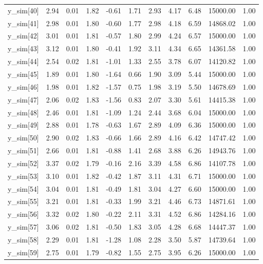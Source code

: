 \begin{table}[ht]
\begin{tabular}{rrrrrrrrrrr}
  y\_sim[40] & 2.94 & 0.01 & 1.82 & -0.61 & 1.71 & 2.93 & 4.17 & 6.48 & 15000.00 & 1.00 \\ 
  y\_sim[41] & 2.98 & 0.01 & 1.80 & -0.60 & 1.77 & 2.98 & 4.18 & 6.59 & 14868.02 & 1.00 \\ 
  y\_sim[42] & 3.01 & 0.01 & 1.81 & -0.57 & 1.80 & 2.99 & 4.24 & 6.57 & 15000.00 & 1.00 \\ 
  y\_sim[43] & 3.12 & 0.01 & 1.80 & -0.41 & 1.92 & 3.11 & 4.34 & 6.65 & 14361.58 & 1.00 \\ 
  y\_sim[44] & 2.54 & 0.02 & 1.81 & -1.01 & 1.33 & 2.55 & 3.78 & 6.07 & 14120.82 & 1.00 \\ 
  y\_sim[45] & 1.89 & 0.01 & 1.80 & -1.64 & 0.66 & 1.90 & 3.09 & 5.44 & 15000.00 & 1.00 \\ 
  y\_sim[46] & 1.98 & 0.01 & 1.82 & -1.57 & 0.75 & 1.98 & 3.19 & 5.50 & 14678.69 & 1.00 \\ 
  y\_sim[47] & 2.06 & 0.02 & 1.83 & -1.56 & 0.83 & 2.07 & 3.30 & 5.61 & 14415.38 & 1.00 \\ 
  y\_sim[48] & 2.46 & 0.01 & 1.81 & -1.09 & 1.24 & 2.44 & 3.68 & 6.04 & 15000.00 & 1.00 \\ 
  y\_sim[49] & 2.88 & 0.01 & 1.78 & -0.63 & 1.67 & 2.89 & 4.09 & 6.36 & 15000.00 & 1.00 \\ 
  y\_sim[50] & 2.90 & 0.02 & 1.83 & -0.66 & 1.66 & 2.89 & 4.16 & 6.42 & 14747.42 & 1.00 \\ 
  y\_sim[51] & 2.66 & 0.01 & 1.81 & -0.88 & 1.41 & 2.68 & 3.88 & 6.26 & 14943.76 & 1.00 \\ 
  y\_sim[52] & 3.37 & 0.02 & 1.79 & -0.16 & 2.16 & 3.39 & 4.58 & 6.86 & 14107.78 & 1.00 \\ 
  y\_sim[53] & 3.10 & 0.01 & 1.82 & -0.42 & 1.87 & 3.11 & 4.31 & 6.71 & 15000.00 & 1.00 \\ 
  y\_sim[54] & 3.04 & 0.01 & 1.81 & -0.49 & 1.81 & 3.04 & 4.27 & 6.60 & 15000.00 & 1.00 \\ 
  y\_sim[55] & 3.21 & 0.01 & 1.81 & -0.33 & 1.99 & 3.21 & 4.46 & 6.73 & 14871.61 & 1.00 \\ 
  y\_sim[56] & 3.32 & 0.02 & 1.80 & -0.22 & 2.11 & 3.31 & 4.52 & 6.86 & 14284.16 & 1.00 \\ 
  y\_sim[57] & 3.06 & 0.02 & 1.81 & -0.50 & 1.83 & 3.05 & 4.28 & 6.68 & 14447.37 & 1.00 \\ 
  y\_sim[58] & 2.29 & 0.01 & 1.81 & -1.28 & 1.08 & 2.28 & 3.50 & 5.87 & 14739.64 & 1.00 \\ 
  y\_sim[59] & 2.75 & 0.01 & 1.79 & -0.82 & 1.55 & 2.75 & 3.95 & 6.26 & 15000.00 & 1.00 \\ 

\end{tabular}
\end{table}
